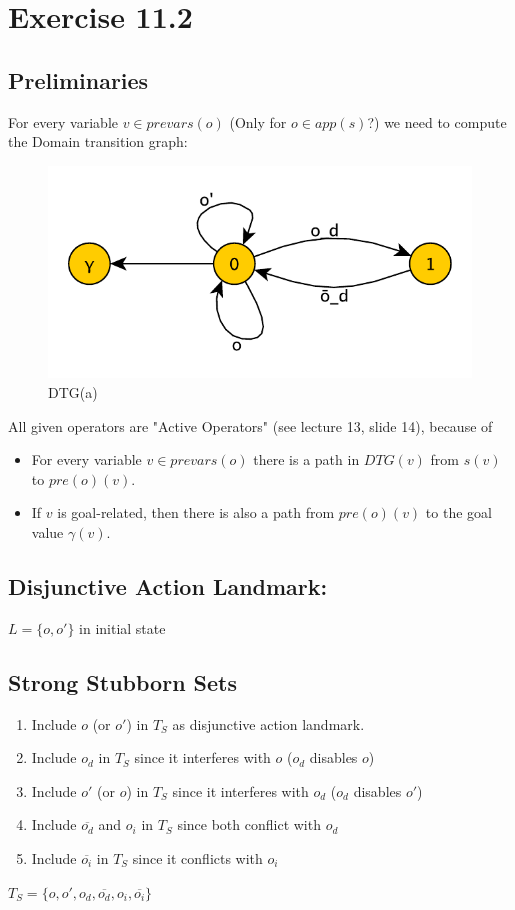 \documentclass[11pt,a4paper]{article}
\begin{document}
\section*{Exercise 11.2}

\subsection*{Preliminaries}
For every variable $ v \in prevars(o) $ (Only for $o \in app(s)$?) we need to compute the Domain transition graph:
\begin{figure}[h!]
\centering
\includegraphics[scale=0.5]{DTG_a}
\caption{DTG(a)}
\end{figure}

All given operators are "Active Operators" (see lecture 13, slide 14), because of
\begin{itemize}
\item For every variable $v \in prevars(o)$ there is a path in $DTG(v)$ from $s(v)$ to $pre(o)(v)$.
\item If $v$ is goal-related, then there is also a path from $pre(o)(v)$ to the goal value $\gamma(v)$.
\end{itemize}

\subsection*{Disjunctive Action Landmark:}
$ L=\{o, o'\} $ in initial state

\subsection*{Strong Stubborn Sets}
\begin{enumerate}
\item Include $o$ (or $o'$) in $T_S$ as disjunctive action landmark.
\item Include $o_d$ in $T_S$ since it interferes with $o$ ($o_d$ disables $o$)
\item Include $o'$ (or $o$) in $T_S$ since it interferes with $o_d$ ($o_d$ disables $o'$)
\item Include $\overline{o_d}$ and $o_i$ in $T_S$ since both conflict with $o_d$
\item Include $\overline{o_i}$ in $T_S$ since it conflicts with $o_i$
\end{enumerate}
$T_S = \{o, o', o_d, \overline{o_d}, o_i, \overline{o_i}\} $
\end{document}
